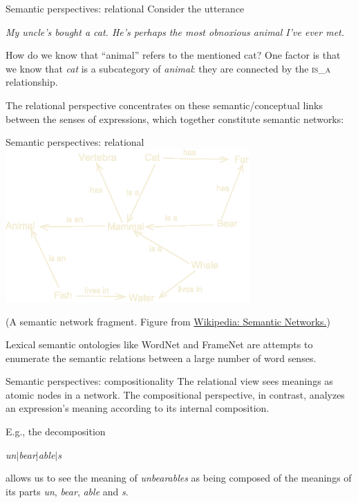\documentclass[style=upen, size=14pt]{powerdot}
\newcommand{\gold}{\color{arany}}
\begin{document}
\begin{slide}[toc=Relational semantics]{Semantic perspectives: relational}
  Consider the utterance

  \bigskip
  \emph{My uncle's bought a cat. He's perhaps the most obnoxious animal I've ever met.}
  \pause
  \bigskip

  How do we know that ``animal'' refers to the mentioned cat? One factor is
  that we know that \emph{cat} is a subcategory of \emph{animal}: they are
  connected by the \textsc{is\_a} relationship.\pause

  \bigskip

  The {\gold relational perspective} concentrates on these semantic/conceptual
  links between the senses of expressions, which together constitute semantic
  networks:
\end{slide}

\begin{slide}[toc=]{Semantic perspectives: relational}
  \includegraphics[width=0.7\textwidth]{semantic_net.eps}

  
  \scriptsize{(A semantic network fragment. Figure from
    \href{https://en.wikipedia.org/wiki/Semantic_network}{Wikipedia: Semantic
      Networks.})}

  \bigskip \normalsize Lexical semantic ontologies like WordNet and FrameNet are
  attempts to enumerate the semantic relations between a large number of word
  senses.
\end{slide}

\begin{slide}[toc=Compositionality]{Semantic perspectives: compositionality}
  The relational view sees meanings as atomic nodes in a network. The {\gold
    compositional perspective}, in contrast, analyzes an expression's meaning
  according to its internal composition.\pause

  \bigskip
  
  E.g., the decomposition \bigskip

  \emph{un$\vert$bear$\vert$able$\vert$s}\pause

  \bigskip allows us to see the meaning of \emph{unbearables} as being composed of
  the meanings of its parts \emph{un}, \emph{bear}, \emph{able} and \emph{s}.
\end{slide}
\end{document}
